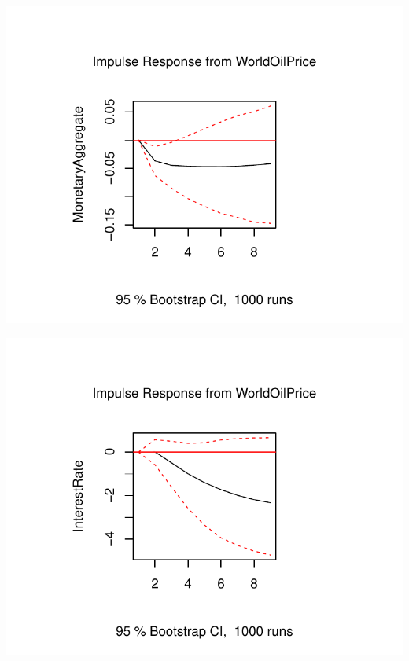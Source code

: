 \documentclass[11pt,preprint, authoryear]{elsarticle}
\numberwithin{equation}{section}
\numberwithin{figure}{section}
\numberwithin{table}{section}
\begin{document}
\begin{center}\includegraphics{README_files/figure-latex/unnamed-chunk-6-1} \end{center}

\begin{center}\includegraphics{README_files/figure-latex/unnamed-chunk-6-2} \end{center}
\end{document}
